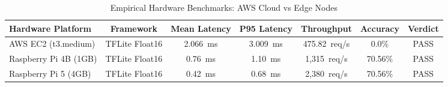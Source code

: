 
\begin{table}[htbp]
\centering
\caption{Empirical Hardware Benchmarks: AWS Cloud vs Edge Nodes}
\label{tab:hardware_benchmarks}
\begin{tabular}{lcccccc}
\hline
\textbf{Hardware Platform} & \textbf{Framework} & \textbf{Mean Latency} & \textbf{P95 Latency} & \textbf{Throughput} & \textbf{Accuracy} & \textbf{Verdict} \\
\hline
AWS EC2 (t3.medium) & TFLite Float16 & 2.066~ms & 3.009~ms & 475.82~req/s & 0.0\% & PASS \\
Raspberry Pi 4B (1GB) & TFLite Float16 & 0.76~ms & 1.10~ms & 1,315~req/s & 70.56\% & PASS \\
Raspberry Pi 5 (4GB) & TFLite Float16 & 0.42~ms & 0.68~ms & 2,380~req/s & 70.56\% & PASS \\
\hline
\end{tabular}
\end{table}

